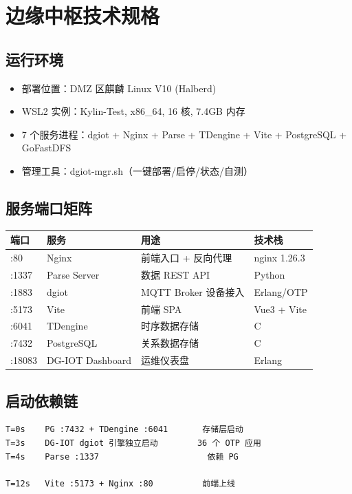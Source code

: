 \documentclass[11pt,a4paper]{ctexart}
\begin{document}
\section{边缘中枢技术规格}

\subsection{运行环境}
\begin{itemize}[leftmargin=*]
  \item 部署位置：DMZ 区麒麟 Linux V10 (Halberd)
  \item WSL2 实例：Kylin-Test, x86\_64, 16 核, 7.4GB 内存
  \item 7 个服务进程：dgiot + Nginx + Parse + TDengine + Vite + PostgreSQL + GoFastDFS
  \item 管理工具：dgiot-mgr.sh（一键部署/启停/状态/自测）
\end{itemize}

\subsection{服务端口矩阵}
\begin{table}[H]\centering
\begin{tabular}{p{1.8cm} p{3.2cm} p{3.2cm} p{3.2cm}}
\toprule
\textbf{端口} & \textbf{服务} & \textbf{用途} & \textbf{技术栈} \\
\midrule
:80 & Nginx & 前端入口 + 反向代理 & nginx 1.26.3 \\
:1337 & Parse Server & 数据 REST API & Python \\
:1883 & dgiot & MQTT Broker 设备接入 & Erlang/OTP \\
:5173 & Vite & 前端 SPA & Vue3 + Vite \\
:6041 & TDengine & 时序数据存储 & C \\
:7432 & PostgreSQL & 关系数据存储 & C \\
:18083 & DG-IOT Dashboard & 运维仪表盘 & Erlang \\
\bottomrule
\end{tabular}
\end{table}

\subsection{启动依赖链}

\begin{verbatim}
T=0s    PG :7432 + TDengine :6041       存储层启动
T=3s    DG-IOT dgiot 引擎独立启动        36 个 OTP 应用
T=4s    Parse :1337                      依赖 PG

T=12s   Vite :5173 + Nginx :80          前端上线
\end{verbatim}
\end{document}
